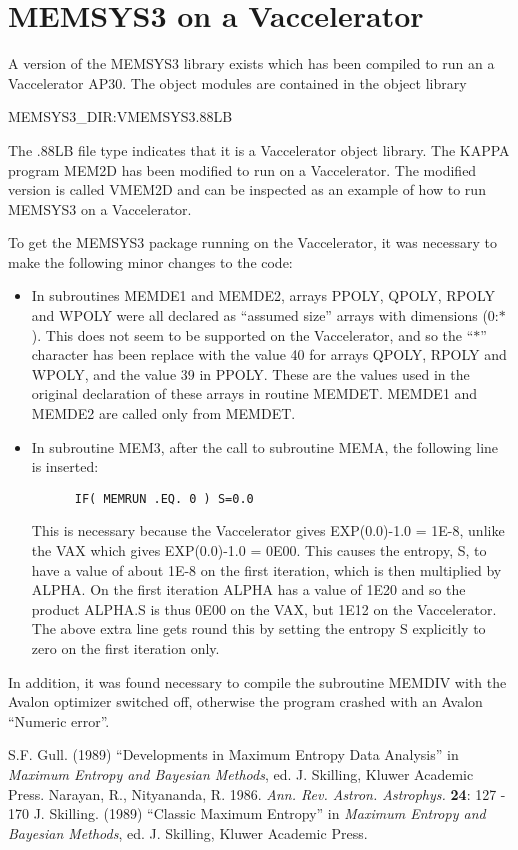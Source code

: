 \section {MEMSYS3 on a Vaccelerator}
A version of the MEMSYS3 library exists which has been compiled to run an a 
Vaccelerator AP30. The object modules are contained in the object library

MEMSYS3\_DIR:VMEMSYS3.88LB

The .88LB file type indicates that it is a Vaccelerator object library. The 
KAPPA program MEM2D has been modified to run on a Vaccelerator. The modified 
version is called VMEM2D and can be inspected as an example of how to run 
MEMSYS3 on a Vaccelerator.

To get the MEMSYS3 package running on the Vaccelerator, it was necessary to
make  the following minor changes to the code:

\begin {itemize}
\item In subroutines MEMDE1 and MEMDE2, arrays PPOLY, QPOLY, RPOLY and WPOLY 
were all declared as ``assumed size'' arrays with dimensions (0:$*$). This does 
not seem to be supported on the Vaccelerator, and so the ``$*$'' character has 
been replace with the value 40 for arrays QPOLY, RPOLY and WPOLY, and the value 
39 in PPOLY. These are the values used in the original declaration of these 
arrays in routine MEMDET. MEMDE1 and MEMDE2 are called only from MEMDET.
\item In subroutine MEM3, after the call to subroutine MEMA, the following line 
is inserted:

\begin{verbatim}
      IF( MEMRUN .EQ. 0 ) S=0.0
\end{verbatim}

This is necessary because the Vaccelerator gives EXP(0.0)-1.0 = 1E-8, unlike the
VAX which gives EXP(0.0)-1.0 = 0E00. This causes the entropy, S, to have a value
of about 1E-8 on the first iteration, which is then multiplied by ALPHA. On the
first iteration ALPHA has a value of 1E20 and so the product  ALPHA.S is thus
0E00 on the VAX, but 1E12 on the Vaccelerator. The above extra line gets round
this by setting the entropy S explicitly to zero on the first iteration only. 

\end {itemize}

In addition, it was found necessary to compile the subroutine MEMDIV with the 
Avalon optimizer switched off, otherwise the program crashed with an Avalon 
``Numeric error''.

\begin{thebibliography}{1}
 S.F. Gull. (1989) ``Developments in Maximum Entropy Data
Analysis'' in {\em Maximum Entropy and Bayesian Methods}, ed. J. 
Skilling, Kluwer Academic Press.
 Narayan, R., Nityananda, R. 1986. {\em Ann. Rev. 
Astron. Astrophys.} {\bf 24}: 127 - 170
 J. Skilling. (1989) ``Classic Maximum Entropy'' in 
{\em Maximum Entropy and Bayesian Methods}, ed. J. Skilling, Kluwer 
Academic Press.
\end{thebibliography}


